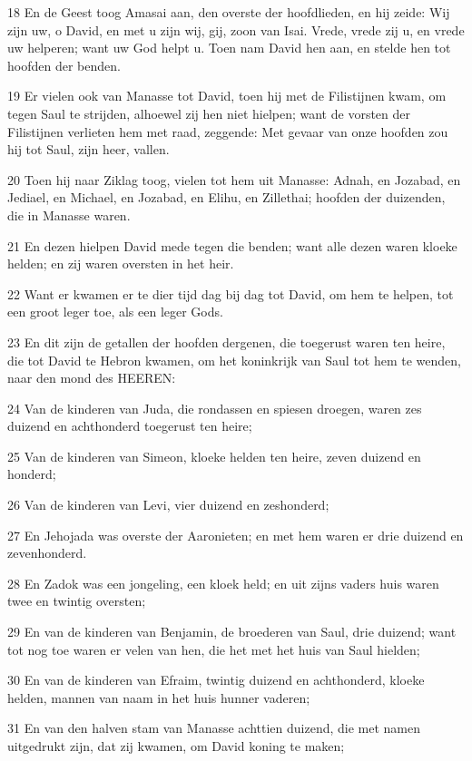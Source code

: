 \par 18 En de Geest toog Amasai aan, den overste der hoofdlieden, en hij zeide: Wij zijn uw, o David, en met u zijn wij, gij, zoon van Isai. Vrede, vrede zij u, en vrede uw helperen; want uw God helpt u. Toen nam David hen aan, en stelde hen tot hoofden der benden.
\par 19 Er vielen ook van Manasse tot David, toen hij met de Filistijnen kwam, om tegen Saul te strijden, alhoewel zij hen niet hielpen; want de vorsten der Filistijnen verlieten hem met raad, zeggende: Met gevaar van onze hoofden zou hij tot Saul, zijn heer, vallen.
\par 20 Toen hij naar Ziklag toog, vielen tot hem uit Manasse: Adnah, en Jozabad, en Jediael, en Michael, en Jozabad, en Elihu, en Zillethai; hoofden der duizenden, die in Manasse waren.
\par 21 En dezen hielpen David mede tegen die benden; want alle dezen waren kloeke helden; en zij waren oversten in het heir.
\par 22 Want er kwamen er te dier tijd dag bij dag tot David, om hem te helpen, tot een groot leger toe, als een leger Gods.
\par 23 En dit zijn de getallen der hoofden dergenen, die toegerust waren ten heire, die tot David te Hebron kwamen, om het koninkrijk van Saul tot hem te wenden, naar den mond des HEEREN:
\par 24 Van de kinderen van Juda, die rondassen en spiesen droegen, waren zes duizend en achthonderd toegerust ten heire;
\par 25 Van de kinderen van Simeon, kloeke helden ten heire, zeven duizend en honderd;
\par 26 Van de kinderen van Levi, vier duizend en zeshonderd;
\par 27 En Jehojada was overste der Aaronieten; en met hem waren er drie duizend en zevenhonderd.
\par 28 En Zadok was een jongeling, een kloek held; en uit zijns vaders huis waren twee en twintig oversten;
\par 29 En van de kinderen van Benjamin, de broederen van Saul, drie duizend; want tot nog toe waren er velen van hen, die het met het huis van Saul hielden;
\par 30 En van de kinderen van Efraim, twintig duizend en achthonderd, kloeke helden, mannen van naam in het huis hunner vaderen;
\par 31 En van den halven stam van Manasse achttien duizend, die met namen uitgedrukt zijn, dat zij kwamen, om David koning te maken;
